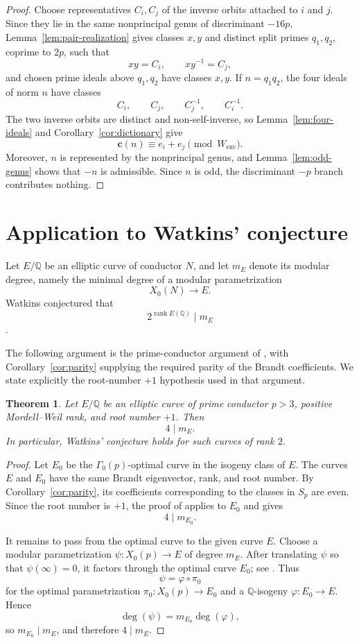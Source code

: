 \documentclass[11pt]{amsart}
\newtheorem{theorem}{Theorem}[section]
\theoremstyle{definition}
\theoremstyle{remark}
\newcommand{\Q}{\mathbb{Q}}
\newcommand{\crow}{\mathbf{c}}
\begin{document}
\begin{proof}
Choose representatives $C_i,C_j$ of the inverse orbits attached to
$i$ and $j$. Since they lie in the same nonprincipal genus of
discriminant $-16p$, Lemma~\ref{lem:pair-realization} gives classes
$x,y$ and distinct split primes $q_1,q_2$, coprime to $2p$, such that
\[
  xy=C_i,
  \qquad
  xy^{-1}=C_j,
\]
and chosen prime ideals above $q_1,q_2$ have classes $x,y$.  If
$n=q_1q_2$, the four ideals of norm $n$ have classes
\[
  C_i,\qquad C_j,\qquad C_j^{-1},\qquad C_i^{-1}.
\]
The two inverse orbits are distinct and non-self-inverse, so
Lemma~\ref{lem:four-ideals} and Corollary~\ref{cor:dictionary} give
\[
  \crow(n)\equiv e_i+e_j\pmod{W_{\mathrm{exc}}}.
\]
Moreover, $n$ is represented by the nonprincipal genus, and
Lemma~\ref{lem:odd-genus} shows that $-n$ is admissible. Since $n$ is
odd, the discriminant $-p$ branch contributes nothing.
\end{proof}



\section{Application to Watkins' conjecture}\label{sec:watkins}

Let $E/\Q$ be an elliptic curve of conductor $N$, and let $m_E$ denote
its modular degree, namely the minimal degree of a modular parametrization
\[
  X_0(N)\longrightarrow E.
\]
Watkins conjectured that
\[
  2^{\operatorname{rank}E(\Q)}\mid m_E
\]
\cite[Conjecture~4.1]{Watkins2002}.

The following argument is the prime-conductor argument of
\cite[Theorem~1.3]{KazalickiKohen2018}, with
Corollary~\ref{cor:parity} supplying the required parity of the Brandt
coefficients. We state explicitly the root-number $+1$ hypothesis used in
that argument.

\begin{theorem}\label{thm:modular-degree}
Let $E/\Q$ be an elliptic curve of prime conductor $p>3$, positive
Mordell--Weil rank, and root number $+1$. Then
\[
  4\mid m_E.
\]
In particular, Watkins' conjecture holds for such curves of rank $2$.
\end{theorem}

\begin{proof}
Let $E_0$ be the $\Gamma_0(p)$-optimal curve in the isogeny class of
$E$. The curves $E$ and $E_0$ have the same Brandt eigenvector, rank, and
root number. By Corollary~\ref{cor:parity}, its coefficients corresponding
to the classes in $S_p$ are even. Since the root number is $+1$, the
proof of \cite[Theorem~1.3]{KazalickiKohen2018} applies to $E_0$ and gives
\[
  4\mid m_{E_0}.
\]

It remains to pass from the optimal curve to the given curve $E$. Choose a modular parametrization
$\psi:X_0(p)\to E$ of degree $m_E$. After translating $\psi$ so that
$\psi(\infty)=0$, it factors through the optimal curve $E_0$; see
\cite[Remark~1.3]{CalegariEmerton2009}. Thus
\[
  \psi=\varphi\circ\pi_0
\]
for the optimal parametrization $\pi_0:X_0(p)\to E_0$ and a
$\Q$-isogeny $\varphi:E_0\to E$. Hence
\[
  \deg(\psi)=m_{E_0}\deg(\varphi),
\]
so $m_{E_0}\mid m_E$, and therefore $4\mid m_E$.
\end{proof}
\end{document}
